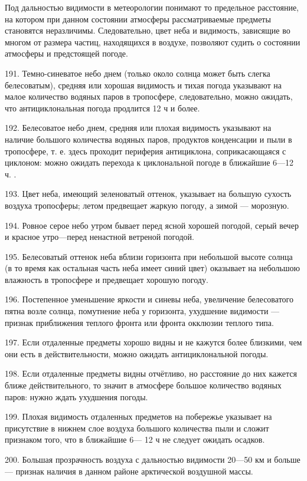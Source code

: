 Под дальностью видимости в метеорологии понимают то предельное расстояние, на котором при данном состоянии атмосферы рассматриваемые предметы становятся неразличимы. Следовательно, цвет неба и видимость, зависящие во многом от размера частиц, находящихся в воздухе, позволяют судить о состоянии атмосферы и предстоящей погоде.

191. Темно-синеватое небо днем (только около солнца может быть слегка белесоватым), средняя или хорошая видимость и тихая погода указывают на малое количество водяных паров в тропосфере, следовательно, можно ожидать, что антициклональная погода продлится 12 ч и более.

192. Белесоватое небо днем, средняя или плохая видимость указывают на наличие большого количества водяных паров, продуктов конденсации и пыли в тропосфере, т. е. здесь проходит периферия антициклона, соприкасающаяся с циклоном: можно ожидать перехода к циклональной погоде в ближайшие 6—12 ч. .

193. Цвет неба, имеющий зеленоватый оттенок, указывает на большую сухость воздуха тропосферы; летом предвещает жаркую погоду, а зимой — морозную.

194. Ровное серое небо утром бывает перед ясной хорошей погодой, серый вечер и красное утро—перед ненастной ветреной погодой.

195. Белесоватый оттенок неба вблизи горизонта при небольшой высоте солнца (в то время как остальная часть неба имеет синий цвет) оказывает на небольшою влажность в тропосфере и предвещает хорошую погоду.

196. Постепенное уменьшение яркости и синевы неба, увеличение белесоватого пятна возле солнца, помутнение неба у горизонта, ухудшение видимости — признак приближения теплого фронта или фронта окклюзии теплого типа.

197. Если отдаленные предметы хорошо видны и не кажутся более близкими, чем они есть в действительности, можно ожидать антициклональной погоды.

198. Если отдаленные предметы видны отчётливо, но расстояние до них кажется ближе действительного, то значит в атмосфере большое количество водяных паров: нужно ждать ухудшения погоды.

199. Плохая видимость отдаленных предметов на побережье указывает на присутствие в нижнем слое воздуха большого количества пыли и сложит признаком того, что в ближайшие 6— 12 ч не следует ожидать осадков.

200. Большая прозрачность воздуха с дальностью видимости 20—50 км и больше — признак наличия в данном районе арктической воздушной массы.

